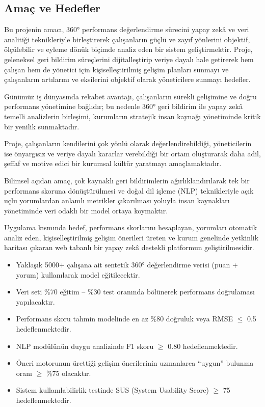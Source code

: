 \documentclass[a4paper,12pt]{article}
\begin{document}
\vspace{2cm}

\subsection*{Amaç ve Hedefler}
\noindent Bu projenin amacı, 360° performans değerlendirme sürecini yapay zekâ ve veri analitiği teknikleriyle birleştirerek çalışanların güçlü ve zayıf yönlerini objektif, ölçülebilir ve eyleme dönük biçimde analiz eden bir sistem geliştirmektir. Proje, geleneksel geri bildirim süreçlerini dijitalleştirip veriye dayalı hale getirerek hem çalışan hem de yönetici için kişiselleştirilmiş gelişim planları sunmayı ve çalışanların artılarını ve eksilerini objektif olarak yöneticilere sunmayı hedefler.


Günümüz iş dünyasında rekabet avantajı, çalışanların sürekli gelişimine ve doğru performans yönetimine bağlıdır; bu nedenle 360° geri bildirim ile yapay zekâ temelli analizlerin birleşimi, kurumların stratejik insan kaynağı yönetiminde kritik bir yenilik sunmaktadır.

Proje, çalışanların kendilerini çok yönlü olarak değerlendirebildiği, yöneticilerin ise önyargısız ve veriye dayalı kararlar verebildiği bir ortam oluşturarak daha adil, şeffaf ve motive edici bir kurumsal kültür yaratmayı amaçlamaktadır.

Bilimsel açıdan amaç, çok kaynaklı geri bildirimlerin ağırlıklandırılarak tek bir performans skoruna dönüştürülmesi ve doğal dil işleme (NLP) teknikleriyle açık uçlu yorumlardan anlamlı metrikler çıkarılması yoluyla insan kaynakları yönetiminde veri odaklı bir model ortaya koymaktır.

Uygulama kısmında hedef, performans skorlarını hesaplayan, yorumları otomatik analiz eden, kişiselleştirilmiş gelişim önerileri üreten ve kurum genelinde yetkinlik haritası çıkaran web tabanlı bir yapay zekâ destekli platformun geliştirilmesidir.

\begin{itemize}
    \item Yaklaşık 5000+ çalışana ait sentetik 360° değerlendirme verisi (puan + yorum) kullanılarak model eğitilecektir.
    \item Veri seti \%70 eğitim – \%30 test oranında bölünerek performans doğrulaması yapılacaktır.
    \item Performans skoru tahmin modelinde en az \%80 doğruluk veya RMSE $\leq$ 0.5 hedeflenmektedir.
    \item NLP modülünün duygu analizinde F1 skoru $\geq$ 0.80 hedeflenmektedir.
    \item Öneri motorunun ürettiği gelişim önerilerinin uzmanlarca “uygun” bulunma oranı $\geq$ \%75 olacaktır.
    \item Sistem kullanılabilirlik testinde SUS (System Usability Score) $\geq$ 75 hedeflenmektedir.
\end{itemize}
\end{document}
